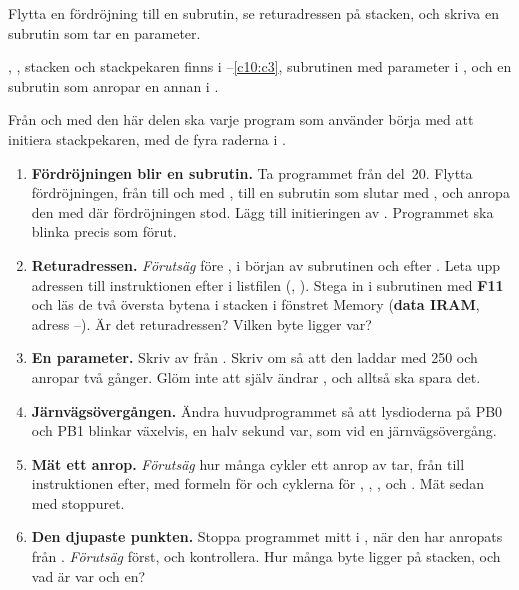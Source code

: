 
\label{lab3:d22}
Flytta en fördröjning till en subrutin, se returadressen på stacken, och skriva en subrutin som tar
en parameter.

, , stacken och stackpekaren finns i --\ref{c10:c3},
subrutinen  med parameter i , och en subrutin som anropar en annan i
.

Från och med den här delen ska varje program som använder  börja med att initiera
stackpekaren, med de fyra raderna i .

\begin{enumerate}
  \item \textbf{Fördröjningen blir en subrutin.} Ta programmet från del~20. Flytta fördröjningen,
    från  till och med , till en subrutin
     som slutar med , och anropa den med  där fördröjningen
    stod. Lägg till initieringen av . Programmet ska blinka precis som förut.
  \item \textbf{Returadressen.} \emph{Förutsäg}  före , i början av
    subrutinen och efter . Leta upp adressen till instruktionen efter  i
    listfilen (, ). Stega in i subrutinen med \textbf{F11} och läs de två
    översta bytena i stacken i fönstret Memory (\textbf{data IRAM}, adress
    --). Är det returadressen? Vilken byte ligger var?
  \item \textbf{En parameter.} Skriv av  från . Skriv om
     så att den laddar  med 250 och anropar  två gånger.
    Glöm inte att  själv ändrar , och alltså ska spara det.
  \item \textbf{Järnvägsövergången.} Ändra huvudprogrammet så att lysdioderna på PB0 och PB1
    blinkar växelvis, en halv sekund var, som vid en järnvägsövergång.
  \item \textbf{Mät ett anrop.} \emph{Förutsäg} hur många cykler ett anrop av 
    tar, från  till instruktionen efter, med formeln för  och cyklerna
    för , , ,  och . Mät sedan med
    stoppuret.
  \item \textbf{Den djupaste punkten.} Stoppa programmet mitt i , när den har
    anropats från . \emph{Förutsäg}  först, och kontrollera. Hur många
    byte ligger på stacken, och vad är var och en?
\end{enumerate}

